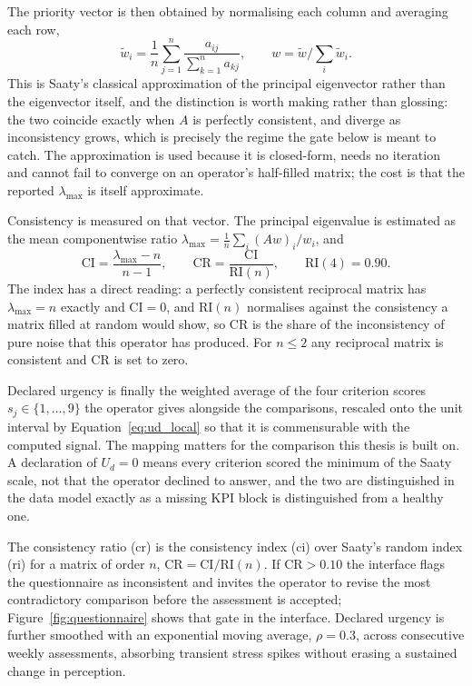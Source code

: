 The priority vector is then obtained by normalising each column and averaging each row,
\begin{equation}
    \tilde{w}_i = \frac{1}{n} \sum_{j=1}^{n} \frac{a_{ij}}{\sum_{k=1}^{n} a_{kj}},
    \qquad
    w = \tilde{w} \Big/ \sum_i \tilde{w}_i .
    \label{eq:ahp_weights}
\end{equation}
This is Saaty's classical approximation of the principal eigenvector rather than the
eigenvector itself, and the distinction is worth making rather than glossing: the two
coincide exactly when $A$ is perfectly consistent, and diverge as inconsistency grows, which
is precisely the regime the gate below is meant to catch. The approximation is used because
it is closed-form, needs no iteration and cannot fail to converge on an operator's
half-filled matrix; the cost is that the reported $\lambda_{\max}$ is itself approximate.

Consistency is measured on that vector. The principal eigenvalue is estimated as the mean
componentwise ratio $\lambda_{\max} = \frac{1}{n}\sum_i (Aw)_i / w_i$, and
\begin{equation}
    \mathrm{CI} = \frac{\lambda_{\max} - n}{n - 1},
    \qquad
    \mathrm{CR} = \frac{\mathrm{CI}}{\mathrm{RI}(n)},
    \qquad \mathrm{RI}(4) = 0.90 .
    \label{eq:ahp_cr}
\end{equation}
The index has a direct reading: a perfectly consistent reciprocal matrix has
$\lambda_{\max} = n$ exactly and $\mathrm{CI} = 0$, and $\mathrm{RI}(n)$ normalises against
the consistency a matrix filled at random would show, so $\mathrm{CR}$ is the share of the
inconsistency of pure noise that this operator has produced. For $n \le 2$ any reciprocal
matrix is consistent and $\mathrm{CR}$ is set to zero.

Declared urgency is finally the weighted average of the four criterion scores
$s_j \in \{1,\ldots,9\}$ the operator gives alongside the comparisons, rescaled onto the unit
interval by Equation~\ref{eq:ud_local} so that it is commensurable with the computed signal.
The mapping matters for the comparison this thesis is built on. A declaration of $U_d = 0$
means every criterion scored the minimum of the Saaty scale, not that the operator declined
to answer, and the two are distinguished in the data model exactly as a missing KPI block is
distinguished from a healthy one.

The consistency ratio (\gls{cr}) is the consistency index (\gls{ci}) over Saaty's random
index (\gls{ri}) for a matrix of order $n$, $\mathrm{CR} = \mathrm{CI}/\mathrm{RI}(n)$. If $\mathrm{CR} > 0.10$ the interface flags the questionnaire as
inconsistent and invites the operator to revise the most contradictory comparison before the
assessment is accepted; Figure~\ref{fig:questionnaire} shows that gate in the interface.
Declared urgency is further smoothed with an exponential moving average, $\rho = 0.3$,
across consecutive weekly assessments, absorbing transient stress spikes without erasing a
sustained change in perception.

